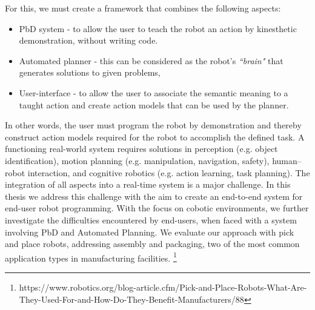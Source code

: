 For this, we must create a framework that combines the following aspects:
\begin{itemize}
	\item PbD system - to allow the user to teach the robot an action by kinesthetic demonstration, without writing code.
	\item Automated planner - this can be considered as the robot's \textit{``brain"} that generates solutions to given problems,
	\item User-interface - to allow the user to associate the semantic meaning to a taught action and create action models that can be used by the planner.
\end{itemize}

In other words, the user must program the robot by demonstration and thereby construct 
action models required for the robot to accomplish the defined task.
A functioning real-world system requires solutions in perception (e.g. object identification), motion planning (e.g. manipulation, navigation, safety), human–robot interaction, and cognitive robotics (e.g. action learning, task planning). 
The integration of all aspects into a real-time system is a major challenge.
In this thesis we address this challenge with the aim to create an end-to-end system for end-user robot programming.
With the focus on cobotic environments, we further investigate the difficulties encountered by end-users, when faced with a system involving PbD and Automated Planning. 
We evaluate our approach with pick and place robots, addressing assembly and packaging, two of the most common application types in manufacturing facilities. \footnote{https://www.robotics.org/blog-article.cfm/Pick-and-Place-Robots-What-Are-They-Used-For-and-How-Do-They-Benefit-Manufacturers/88}

%

